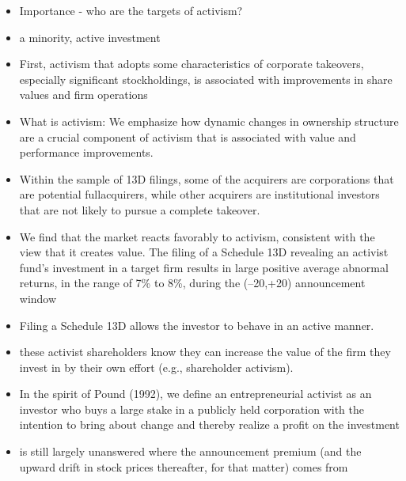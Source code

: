\documentclass[12pt]{article}
\begin{document}
    \begin{itemize}
        
        \item Importance - who are the targets of activism? \citep{CoffeeJr.2014}

        \item a minority, active investment \citep{Damodaran2005}
         
        \item First, activism that adopts some characteristics of corporate takeovers, especially significant stockholdings, is associated with improvements in share values and firm operations \citep{Denes2017}

        \item What is activism:  We emphasize how dynamic changes in ownership structure are a crucial component of activism that is associated with value and performance improvements.\citep{Denes2017}

        \item Within the sample of 13D filings, some of the acquirers are corporations that are potential fullacquirers, while other acquirers are institutional investors that are not likely to pursue a complete takeover. \citep{Brigida2012}

        \item We find that the market reacts favorably to activism, consistent with the view that it creates value. The filing of a Schedule 13D revealing an activist fund’s investment in a target firm results in large positive average abnormal returns, in the range of 7\% to 8\%, during the (–20,+20) announcement window \citep{Brav2008}

        \item Filing a Schedule 13D allows the investor to behave in an active manner. \citep{Brigida2012}

        \item these activist shareholders know they can increase the value of the firm they invest in by their own effort (e.g., shareholder activism).\citep{Collin-Dufresne2015}

        \item In the spirit of Pound (1992), we define an entrepreneurial activist as an investor who buys a large stake in a publicly held corporation with the intention to bring about change and thereby realize a profit on the investment \citep{Klein2009}

        \item is still largely unanswered where the announcement premium (and the upward drift in stock prices thereafter, for that matter) comes from \citep{Greenwood2009}


\end{itemize}
\end{document}
